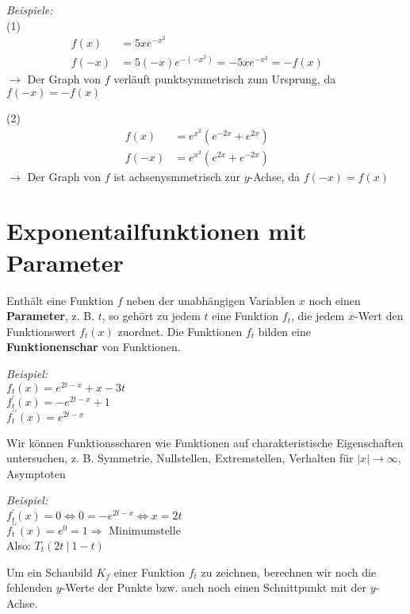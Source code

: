 \textit{Beispiele:} \\
(1)
\begin{align*}
    f(x) & = 5xe^{-x^2} && \\
    f(-x) & = 5(-x)e^{-(-x^2)} = -5xe^{-x^2} = -f(x) &&
\end{align*}
$\rightarrow$ Der Graph von $f$ verläuft punktsymmetrisch zum Ursprung, da $f(-x) = -f(x)$

(2)
\begin{align*}
    f(x) & = e^{x^2}\left(e^{-2x} + e^{2x}\right) && \\
    f(-x) & = e^{x^2}\left(e^{2x} + e^{-2x}\right) &&
\end{align*}
$\rightarrow$ Der Graph von $f$ ist achsenysmmetrisch zur $y$-Achse, da $f(-x) = f(x)$

\section{Exponentailfunktionen mit Parameter}

\begin{definition}
    Enthält eine Funktion $f$ neben der unabhängigen Variablen $x$ noch einen \textbf{Parameter}, z. B. $t$, so gehört zu jedem $t$ eine Funktion $f_t$, die jedem $x$-Wert den Funktionswert $f_t(x)$ zuordnet. Die Funktionen $f_t$ bilden eine \textbf{Funktionenschar} von Funktionen.
\end{definition}
\textit{Beispiel:} \\
$f_t(x) = e^{2t - x} + x - 3t$\\
$f^\prime_t(x) = -e^{2t-x} + 1$\\
$f^{\prime\prime}_t(x) = e^{2t - x}$

Wir können Funktionsscharen wie Funktionen auf charakteristische Eigenschaften untersuchen, z. B. Symmetrie, Nullstellen, Extremstellen, Verhalten für $|x| \to \infty$, Asymptoten 

\textit{Beispiel:}\\
$f^\prime_t(x) = 0 \Longleftrightarrow 0 = -e^{2t - x} \Longleftrightarrow x = 2t$\\
$f^{\prime\prime}_t(x) = e^0 = 1 \Rightarrow \text{ Minimumstelle}$ \\
Also: $T_t( 2t \ | \ 1-t )$

Um ein Schaubild $K_f$ einer Funktion $f_t$ zu zeichnen, berechnen wir noch die fehlenden $y$-Werte der Punkte bzw. auch noch einen Schnittpunkt mit der $y$- Achse. 

